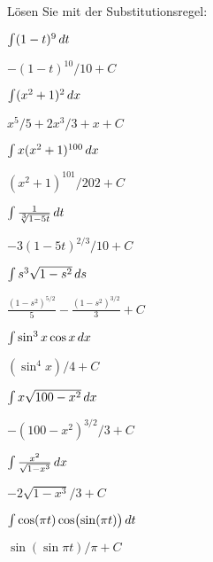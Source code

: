 \begin{exercises}
Lösen Sie mit der Substitutionsregel:
\twocol

\begin{exercise} $\int (1-t)^9\, d t$
\begin{answer} $-(1-t)^{10}/10+C$
\end{answer}\end{exercise}

\begin{exercise} $\int (x^2+1)^2\, d x$
\begin{answer} $x^5/5+2x^3/3+x+C$
\end{answer}\end{exercise}

\begin{exercise} $\int x(x^2+1)^{100}\, d x$
\begin{answer} $(x^2+1)^{101}/202+C$
\end{answer}\end{exercise}

\begin{exercise} $\int {1\over\root 3 \of {1-5t}}\d t$ 
\begin{answer} $-3(1-5t)^{2/3}/10+C$
\end{answer}\end{exercise}

\begin{exercise} $\int s^3\sqrt{1-s^2}\, d s$
\begin{answer} $\frac{(1-s^2)^{5/2}}{5} - \frac{(1-s^2)^{3/2}}{3}+C$
\end{answer}\end{exercise}
\begin{exercise} $\int \sin^3x\cos x\, d x$
\begin{answer} $(\sin^4x)/4+C$
\end{answer}\end{exercise}

\begin{exercise} $\int x\sqrt{100-x^2}\, d x$
\begin{answer} $-(100-x^2)^{3/2}/3+C$
\end{answer}\end{exercise}

\begin{exercise} $\int {x^2\over\sqrt{1-x^3}}\, d x$
\begin{answer} $-2\sqrt{1-x^3}/3+C$
\end{answer}\end{exercise}

\begin{exercise} $\int \cos(\pi t)\cos\bigl(\sin(\pi t)\bigr)\, d t$
\begin{answer} $\sin(\sin\pi t)/\pi+C$
\end{answer}\end{exercise}


\end{exercises}
